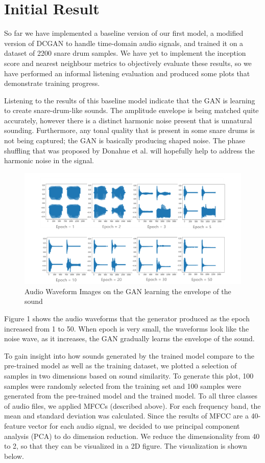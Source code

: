 \documentclass{article} %
\begin{document}
\section{Initial Result}
So far we have implemented a baseline version of our first model, a modified version of DCGAN to handle time-domain audio signals, and trained it on a dataset of 2200 snare drum samples. We have yet to implement the inception score and nearest neighbour metrics to objectively evaluate these results, so we have performed an informal listening evaluation and produced some plots that demonstrate training progress. 

Listening to the results of this baseline model indicate that the GAN is learning to create snare-drum-like sounds. The amplitude envelope is being matched quite accurately, however there is a distinct harmonic noise present that is unnatural sounding. Furthermore, any tonal quality that is present in some snare drums is not being captured; the GAN is basically producing shaped noise. The phase shuffling that was proposed by Donahue et al. will hopefully help to address the harmonic noise in the signal. 

\begin{figure}[H] 
\centering 
\includegraphics[width=1.0\textwidth]{image} 
\caption{Audio Waveform Images on the GAN learning the envelope of the sound}
\label{Fig.main2}
\end{figure}
Figure 1 shows the audio waveforms that the generator produced as the epoch increased from 1 to 50. When epoch is very small, the waveforms look like the noise wave, as it increases, the GAN gradually learns the envelope of the sound.   

To gain insight into how sounds generated by the trained model compare to the pre-trained model as well as the training dataset, we plotted a selection of samples in two dimensions based on sound similarity. To generate this plot, 100 samples were randomly selected from the training set and 100 samples were generated from the pre-trained model and the trained model. To all three classes of audio files, we applied MFCCs (described above). For each frequency band, the mean and standard deviation was calculated. Since the results of MFCC are a 40-feature vector for each audio signal, we decided to use principal component analysis (PCA) to do dimension reduction. We reduce the dimensionality from 40 to 2, so that they can be visualized in a 2D figure. The visualization is shown below. 
\end{document}
